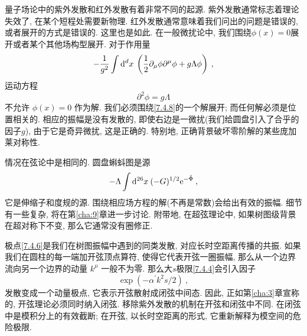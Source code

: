 量子场论中的紫外发散和红外发散有着非常不同的起源. 紫外发散通常标志着理论失效了, 在某个短程处需要新物理. 红外发散通常意味着我们问出的问题是错误的, 
或者展开的方式是错误的. 这里也是如此. 在一般微扰论中, 我们围绕$\phi(x)=0$展开或者某个其他场构型展开. 对于作用量
\begin{equation}
	-\frac{1}{g^{2}} \int \mathrm{d}^{d} x \: \left(\frac{1}{2} \partial_{\mu} \phi \partial^{\mu} \phi+g \Lambda \phi\right) \:, \label{7.4.7}
\end{equation}
运动方程
\begin{equation}
	\partial^{2} \phi=g \Lambda \label{7.4.8}
\end{equation}
不允许 $\phi(x)=0$ 作为解. 我们必须围绕\eqref{7.4.8}的一个解展开; 而任何解必须是位置相关的. 相应的振幅是没有发散的, 
即使右边是一微扰(我们给圆盘引入了合乎的因子$g$), 由于它是奇异微扰, 这是正确的. 特别地, 正确背景破坏零阶解的某些庞加莱对称性.

情况在弦论中是相同的. 圆盘蝌蚪图是源
\begin{equation}
	-\Lambda \int \mathrm{d}^{26} x\: (-G)^{1 / 2} \mathrm{e}^{-\tilde{\Phi}} \:, \label{7.4.9}
\end{equation}
它是伸缩子和度规的源. 围绕相应场方程的解(不再是常数)会给出有效的振幅. 细节有一些复杂, 将在第\ref{cha:9}章进一步讨论. 
附带地, 在超弦理论中, 如果树图级背景在超对称下不变, 那么它通常没有圈修正.

极点\eqref{7.4.6}是我们在树图振幅中遇到的同类发散, 对应长时空距离传播的共振. 如果我们在圆柱的每一端加开弦顶点算符, 使得它代表开弦一圈振幅, 那么从一个边界流向另一个边界的动量 $k^{\mu}$ 一般不为零. 那么大$s$极限\eqref{7.4.4}会引入因子
\begin{equation}
	\exp (-\alpha^{\prime} k^{2} s / 2)\:, \label{7.4.10}
\end{equation}
发散变成一个动量极点, 它表示开弦散射成闭弦中间态. 因此, 正如第\ref{cha:3}章宣称的, 开弦理论必须同时纳入闭弦. 移除紫外发散的机制在开弦和闭弦中不同. 
在闭弦中是模积分上的有效截断; 在开弦, 以长时空距离的形式, 它重新解释为模空间的危险极限.

